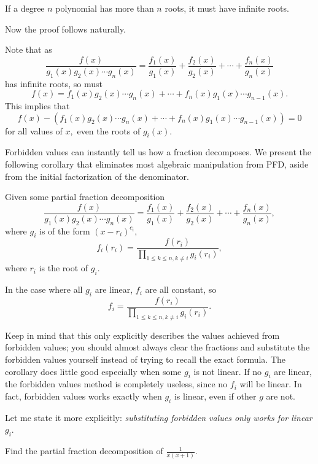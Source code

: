 \documentclass[mast]{lucky}
\begin{document}
\begin{theo}
If a degree $n$ polynomial has more than $n$ roots, it must have infinite roots.
\end{theo}

Now the proof follows naturally.

\begin{pro}
Note that as
\[\frac{f(x)}{g_1(x)g_2(x)\cdots g_n(x)}=\frac{f_1(x)}{g_1(x)}+\frac{f_2(x)}{g_2(x)}+\cdots+\frac{f_n(x)}{g_n(x)}\]
has infinite roots, so must 
\[f(x)=f_1(x)g_2(x)\cdots g_n(x)+\cdots+f_n(x)g_1(x)\cdots g_{n-1}(x).\]
This implies that
\[f(x)-(f_1(x)g_2(x)\cdots g_n(x)+\cdots+f_n(x)g_1(x)\cdots g_{n-1}(x))=0\]
for all values of $x,$ even the roots of $g_i(x).$
\end{pro}

Forbidden values can instantly tell us how a fraction decomposes. We present the following corollary that eliminates most algebraic manipulation from PFD, aside from the initial factorization of the denominator.

\begin{corollary}
Given some partial fraction decomposition
\[\frac{f(x)}{g_1(x)g_2(x)\cdots g_n(x)}=\frac{f_1(x)}{g_1(x)}+\frac{f_2(x)}{g_2(x)}+\cdots+\frac{f_n(x)}{g_n(x)},\] where $g_i$ is of the form $(x-r_i)^{c_i},$
\[f_i(r_i)=\frac{f(r_i)}{\prod\limits_{1\leq k\leq n, k\neq i}g_i(r_i)},\] where $r_i$ is the root of $g_i.$

In the case where all $g_i$ are linear, $f_i$ are all constant, so \[f_i=\frac{f(r_i)}{\prod\limits_{1\leq k\leq n,k\neq i}g_i(r_i)}.\]
\end{corollary}

Keep in mind that this only explicitly describes the values achieved from forbidden values; you should almost always clear the fractions and substitute the forbidden values yourself instead of trying to recall the exact formula. The corollary does little good especially when some $g_i$ is not linear. If no $g_i$ are linear, the forbidden values method is completely useless, since no $f_i$ will be linear. In fact, forbidden values works exactly when $g_i$ is linear, even if other $g$ are not.

Let me state it more explicitly: \emph{substituting forbidden values only works for linear $g_i$}.

\begin{exam}
Find the partial fraction decomposition of $\frac{1}{x(x+1)}.$
\end{exam}
\end{document}
